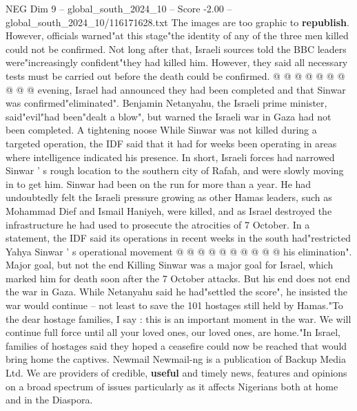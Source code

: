 \begin{textsample}{NEG Dim 9 – global\_south\_2024\_10 – Score -2.00 – global\_south\_2024\_10/116171628.txt}
The images are too graphic to \textbf{republish}.
However, officials warned"at this stage"the identity of any of the three men killed could not be confirmed.
Not long after that, Israeli sources told the BBC leaders were"increasingly confident"they had killed him.
However, they said all necessary tests must be carried out before the death could be confirmed. @ @ @ @ @ @ @ @ @ @ evening, Israel had announced they had been completed and that Sinwar was confirmed"eliminated".
Benjamin Netanyahu, the Israeli prime minister, said"evil"had been"dealt a blow", but warned the Israeli war in Gaza had not been completed.
A tightening noose While Sinwar was not killed during a targeted operation, the IDF said that it had for weeks been operating in areas where intelligence indicated his presence.
In short, Israeli forces had narrowed Sinwar ' s rough location to the southern city of Rafah, and were slowly moving in to get him.
Sinwar had been on the run for more than a year.
He had undoubtedly felt the Israeli pressure growing as other Hamas leaders, such as Mohammad Dief and Ismail Haniyeh, were killed, and as Israel destroyed the infrastructure he had used to prosecute the atrocities of 7 October.
In a statement, the IDF said its operations in recent weeks in the south had"restricted Yahya Sinwar ' s operational movement @ @ @ @ @ @ @ @ @ @ his elimination".
Major goal, but not the end Killing Sinwar was a major goal for Israel, which marked him for death soon after the 7 October attacks.
But his end does not end the war in Gaza.
While Netanyahu said he had"settled the score", he insisted the war would continue -- not least to save the 101 hostages still held by Hamas."To the dear hostage families, I say : this is an important moment in the war.
We will continue full force until all your loved ones, our loved ones, are home."In Israel, families of hostages said they hoped a ceasefire could now be reached that would bring home the captives.
Newmail Newmail-ng is a publication of Backup Media Ltd.
We are providers of credible, \textbf{useful} and timely news, features and opinions on a broad spectrum of issues particularly as it affects Nigerians both at home and in the Diaspora.

\end{textsample}
